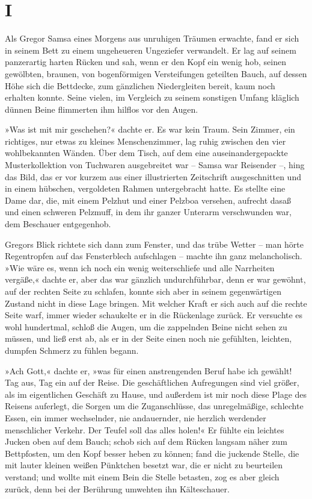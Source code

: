 \section{I}

Als Gregor Samsa eines Morgens aus unruhigen Träumen erwachte, fand er
sich in seinem Bett zu einem ungeheueren Ungeziefer verwandelt. Er lag
auf seinem panzerartig harten Rücken und sah, wenn er den Kopf ein wenig
hob, seinen gewölbten, braunen, von bogenförmigen Versteifungen
geteilten Bauch, auf dessen Höhe sich die Bettdecke, zum gänzlichen
Niedergleiten bereit, kaum noch erhalten konnte. Seine vielen, im
Vergleich zu seinem sonstigen Umfang kläglich dünnen Beine flimmerten
ihm hilflos vor den Augen.

»Was ist mit mir geschehen?« dachte er. Es war kein Traum. Sein Zimmer,
ein richtiges, nur etwas zu kleines Menschenzimmer, lag ruhig zwischen
den vier wohlbekannten Wänden. Über dem Tisch, auf dem eine
auseinandergepackte Musterkollektion von Tuchwaren ausgebreitet war --
Samsa war Reisender --, hing das Bild, das er vor kurzem aus einer
illustrierten Zeitschrift ausgeschnitten und in einem hübschen,
vergoldeten Rahmen untergebracht hatte. Es stellte eine Dame dar, die,
mit einem Pelzhut und einer Pelzboa versehen, aufrecht dasaß und einen
schweren Pelzmuff, in dem ihr ganzer Unterarm verschwunden war, dem
Beschauer entgegenhob.

Gregors Blick richtete sich dann zum Fenster, und das trübe Wetter --
man hörte Regentropfen auf das Fensterblech aufschlagen -- machte ihn
ganz melancholisch. »Wie wäre es, wenn ich noch ein wenig
weiterschliefe und alle Narrheiten vergäße,« dachte er, aber das war
gänzlich undurchführbar, denn er war gewöhnt, auf der rechten Seite zu
schlafen, konnte sich aber in seinem gegenwärtigen Zustand nicht in
diese Lage bringen. Mit welcher Kraft er sich auch auf die rechte Seite
warf, immer wieder schaukelte er in die Rückenlage zurück. Er versuchte
es wohl hundertmal, schloß die Augen, um die zappelnden Beine nicht
sehen zu müssen, und ließ erst ab, als er in der Seite einen noch nie
gefühlten, leichten, dumpfen Schmerz zu fühlen begann.

»Ach Gott,« dachte er, »was für einen anstrengenden Beruf habe ich
gewählt! Tag aus, Tag ein auf der Reise. Die geschäftlichen Aufregungen
sind viel größer, als im eigentlichen Geschäft zu Hause, und außerdem
ist mir noch diese Plage des Reisens auferlegt, die Sorgen um die
Zuganschlüsse, das unregelmäßige, schlechte Essen, ein immer
wechselnder, nie andauernder, nie herzlich werdender menschlicher
Verkehr. Der Teufel soll das alles holen!« Er fühlte ein leichtes Jucken
oben auf dem Bauch; schob sich auf dem Rücken langsam näher zum
Bettpfosten, um den Kopf besser heben zu können; fand die juckende
Stelle, die mit lauter kleinen weißen Pünktchen besetzt war, die er
nicht zu beurteilen verstand; und wollte mit einem Bein die Stelle
betasten, zog es aber gleich zurück, denn bei der Berührung umwehten ihn
Kälteschauer.

